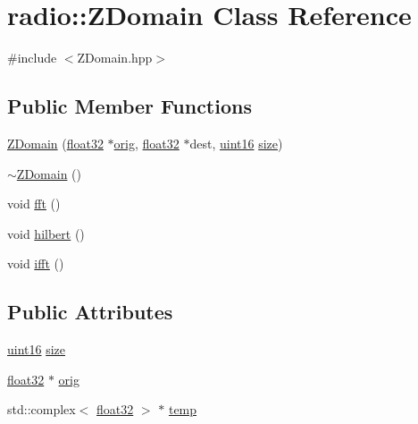 \hypertarget{classradio_1_1ZDomain}{\section{radio\+:\+:Z\+Domain Class Reference}
\label{classradio_1_1ZDomain}
}


{\ttfamily \#include $<$Z\+Domain.\+hpp$>$}

\subsection*{Public Member Functions}
\begin{DoxyCompactItemize}
\item 
\hyperlink{classradio_1_1ZDomain_a4eec389cfb236f28cda5e66a65d86558}{Z\+Domain} (\hyperlink{definitions_8hpp_aacdc525d6f7bddb3ae95d5c311bd06a1}{float32} $\ast$\hyperlink{classradio_1_1ZDomain_afd6f4cc19657c9074d1afb9b89a5fbc2}{orig}, \hyperlink{definitions_8hpp_aacdc525d6f7bddb3ae95d5c311bd06a1}{float32} $\ast$dest, \hyperlink{definitions_8hpp_a05f6b0ae8f6a6e135b0e290c25fe0e4e}{uint16} \hyperlink{classradio_1_1ZDomain_a4cd757a40cbd98b29a64557fab4b23f5}{size})
\item 
\hyperlink{classradio_1_1ZDomain_ae9e0bc3e12b7ac15099d54fe13b00a86}{$\sim$\+Z\+Domain} ()
\item 
void \hyperlink{classradio_1_1ZDomain_a8ce67c0185428f8bf8de998481798593}{fft} ()
\item 
void \hyperlink{classradio_1_1ZDomain_ac6de3f5864558c598c4043a551aa073a}{hilbert} ()
\item 
void \hyperlink{classradio_1_1ZDomain_a7f9c3519330e336c5382abe884a83b7a}{ifft} ()
\end{DoxyCompactItemize}
\subsection*{Public Attributes}
\begin{DoxyCompactItemize}
\item 
\hyperlink{definitions_8hpp_a05f6b0ae8f6a6e135b0e290c25fe0e4e}{uint16} \hyperlink{classradio_1_1ZDomain_a4cd757a40cbd98b29a64557fab4b23f5}{size}
\item 
\hyperlink{definitions_8hpp_aacdc525d6f7bddb3ae95d5c311bd06a1}{float32} $\ast$ \hyperlink{classradio_1_1ZDomain_afd6f4cc19657c9074d1afb9b89a5fbc2}{orig}
\item 
std\+::complex$<$ \hyperlink{definitions_8hpp_aacdc525d6f7bddb3ae95d5c311bd06a1}{float32} $>$ $\ast$ \hyperlink{classradio_1_1ZDomain_aac575115f72d07c8e15178e9707592ce}{temp}
\end{DoxyCompactItemize}
